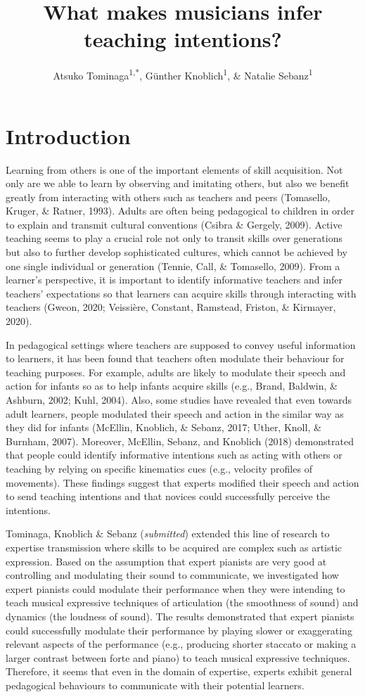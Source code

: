 \documentclass[
  man,floatsintext]{apa6}
\title{What makes musicians infer teaching intentions?}
\author{Atsuko Tominaga\textsuperscript{1,*}, Günther Knoblich\textsuperscript{1}, \& Natalie Sebanz\textsuperscript{1}}
\date{}
\affiliation{\vspace{0.5cm}\textsuperscript{1} Department of Cognitive Science, Central European University, Quellenstraße 51, 1100 Vienna, Austria\\\textsuperscript{*} Corresponding author: \href{mailto:Tominaga_Atsuko@phd.ceu.edu}{\nolinkurl{Tominaga\_Atsuko@phd.ceu.edu}}}
\begin{document}
\maketitle

\hypertarget{introduction}{%
\section{Introduction}\label{introduction}}

Learning from others is one of the important elements of skill acquisition. Not only are we able to learn by observing and imitating others, but also we benefit greatly from interacting with others such as teachers and peers (Tomasello, Kruger, \& Ratner, 1993). Adults are often being pedagogical to children in order to explain and transmit cultural conventions (Csibra \& Gergely, 2009). Active teaching seems to play a crucial role not only to transit skills over generations but also to further develop sophisticated cultures, which cannot be achieved by one single individual or generation (Tennie, Call, \& Tomasello, 2009). From a learner's perspective, it is important to identify informative teachers and infer teachers' expectations so that learners can acquire skills through interacting with teachers (Gweon, 2020; Veissière, Constant, Ramstead, Friston, \& Kirmayer, 2020).

In pedagogical settings where teachers are supposed to convey useful information to learners, it has been found that teachers often modulate their behaviour for teaching purposes. For example, adults are likely to modulate their speech and action for infants so as to help infants acquire skills (e.g., Brand, Baldwin, \& Ashburn, 2002; Kuhl, 2004). Also, some studies have revealed that even towards adult learners, people modulated their speech and action in the similar way as they did for infants (McEllin, Knoblich, \& Sebanz, 2017; Uther, Knoll, \& Burnham, 2007). Moreover, McEllin, Sebanz, and Knoblich (2018) demonstrated that people could identify informative intentions such as acting with others or teaching by relying on specific kinematics cues (e.g., velocity profiles of movements). These findings suggest that experts modified their speech and action to send teaching intentions and that novices could successfully perceive the intentions.

Tominaga, Knoblich \& Sebanz (\emph{submitted}) extended this line of research to expertise transmission where skills to be acquired are complex such as artistic expression. Based on the assumption that expert pianists are very good at controlling and modulating their sound to communicate, we investigated how expert pianists could modulate their performance when they were intending to teach musical expressive techniques of articulation (the smoothness of sound) and dynamics (the loudness of sound). The results demonstrated that expert pianists could successfully modulate their performance by playing slower or exaggerating relevant aspects of the performance (e.g., producing shorter staccato or making a larger contrast between forte and piano) to teach musical expressive techniques. Therefore, it seems that even in the domain of expertise, experts exhibit general pedagogical behaviours to communicate with their potential learners.
\end{document}
